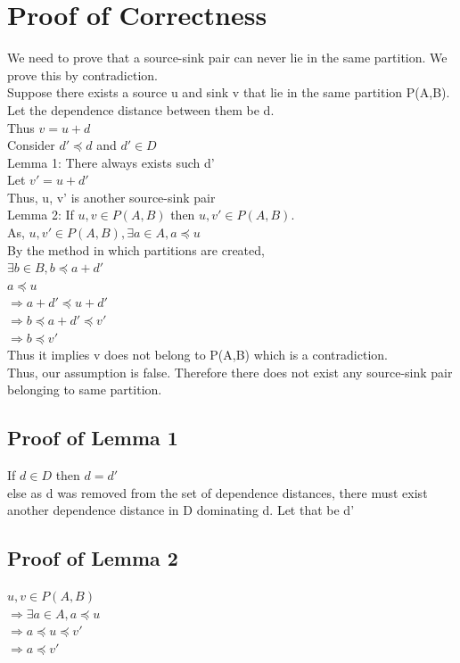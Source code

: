 \section{Proof of Correctness}
We need to prove that a source-sink pair can never lie in the same partition. We prove this by contradiction. \\

Suppose there exists a source u and sink v that lie in the same partition P(A,B).
Let the dependence distance between them be d.\\
Thus $v = u + d$\\
Consider $d' \preceq d$ and $d' \in D$\\

Lemma 1: There always exists such d'\\

\noindent Let $ v' = u + d'$\\
Thus, u, v' is another source-sink pair\\

Lemma 2: If $u, v \in P(A,B)$  then $u , v' \in P(A,B)$.\\

\noindent As, $u, v' \in P(A,B), \exists a \in A, a \preceq u$ \\
By the method in which partitions are created, \\
$\exists b \in B, b \preceq a + d'$ \\
$a \preceq u$ \\
$ \Rightarrow a + d' \preceq u + d'$ \\
$\Rightarrow b \preceq a + d' \preceq v'$ \\
$\Rightarrow b \preceq v'$ \\
Thus it implies v does not belong to P(A,B) which is a contradiction. \\

Thus, our assumption is false. Therefore there does not exist any source-sink pair belonging to same partition.\\

\subsection{Proof of Lemma 1}
If $d \in D$ then $d = d'$\\
else as d was removed from the set of dependence distances, there must exist another dependence distance in D dominating d. Let that be d' \\


\subsection{Proof of Lemma 2}
$u,v \in P(A,B)$ \\
$\Rightarrow \exists a \in A , a \preceq u$ \\
$ \Rightarrow a \preceq u \preceq v'$ \\
$ \Rightarrow a \preceq v' $ \\

